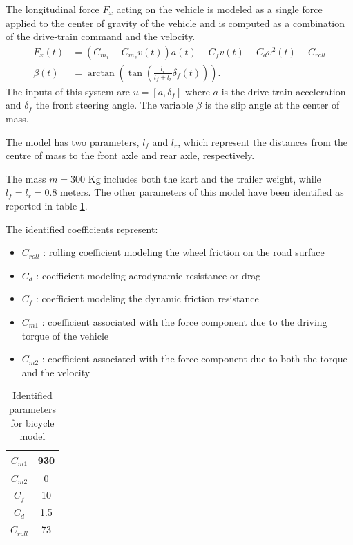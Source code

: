 \documentclass[a4paper,12pt,oneside]{book}
\begin{document}
The longitudinal force $F_x$ acting on the vehicle is modeled as a single force applied to the center of gravity of the vehicle and is computed as a combination of the drive-train command and the velocity. 
\begin{align}
    F_x (t) &= (C_{m_1} - C_{m_2} v(t)) a(t) - C_f v(t) - C_d v^2(t) - C_{roll} \label{eq:Long_force}\\
    \beta(t) &= \arctan\left(\tan\left(\frac{l_r}{l_f+l_r}\delta_f(t)\right) \right).
\end{align}
The inputs of this system are $u = [a, \delta_f]$ where $a$ is the drive-train acceleration and $\delta_f$ the front steering angle. 
The variable $\beta$ is the slip angle at the center of mass. 

\bigskip
The model has two parameters, $l_f$ and $l_r$, which represent the distances from the centre of mass to the front axle and rear axle, respectively.

The mass $m = 300$ Kg includes both the kart and the trailer weight, while $l_f = l_r = 0.8$ meters.
The other parameters of this model have been identified as reported in table \ref{tab:Parameters}.


\bigskip
The identified coefficients represent:
\begin{itemize}
    \item $C_{roll}$ : rolling coefficient modeling the wheel friction on the road surface
    \item $C_d$ : coefficient modeling aerodynamic resistance or drag
    \item $C_f$ : coefficient modeling the dynamic friction resistance
    \item $C_{m1}$ : coefficient associated with the force component due to the driving torque of the vehicle
    \item $C_{m2}$ : coefficient associated with the force component due to both the torque and the velocity
\end{itemize}

\begin{table}[h!]
    \centering
    \begin{tabular}{|c|c|}
        \hline
        $C_{m1}$ & 930 \\
        \hline
        $C_{m2}$ & 0 \\
        \hline
        $C_f$ & 10 \\
        \hline
        $C_d$ & 1.5 \\
        \hline
        $C_{roll}$ & 73 \\
        \hline
    \end{tabular}
    \caption{Identified parameters for bicycle model}
    \label{tab:Parameters}
\end{table}
\end{document}
